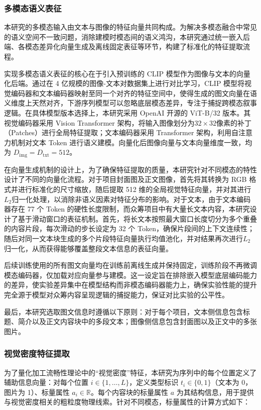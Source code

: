 \subsubsection{多模态语义表征}
本研究的多模态输入由文本与图像的特征向量共同构成。为解决多模态融合中常见的语义空间不一致问题，消除建模时模态间的语义鸿沟，本研究通过统一嵌入后端、各模态差异化向量生成及离线固定表征等环节，构建了标准化的特征提取流程。

实现多模态语义表征的核心在于引入预训练的 CLIP 模型作为图像与文本的向量化后端。通过在 4 亿规模的图像-文本对数据集上进行对比学习，CLIP 模型将视觉编码器和文本编码器映射至同一个对齐的特征空间中，使得生成的图文向量在语义维度上天然对齐，下游序列模型可以忽略底层模态差异，专注于捕捉跨模态叙事逻辑。在具体模型版本选择上，本研究采用 OpenAI 开源的 ViT-B/32 版本。其视觉编码器采用 Vision Transformer 架构，将输入图像划分为$ 32 \times 32 $像素的补丁（Patches）进行全局特征提取；文本编码器采用 Transformer 架构，利用自注意力机制对文本 Token 进行语义建模。向量化后图像向量与文本向量维度一致，均为 $ D_{\text{img}}=D_{\text{txt}}=512 $。

在向量生成机制的设计上，为了确保特征提取的质量，本研究针对不同模态的特性设计了不同的向量化流程。对于项目封面图及正文图像，首先将其转换为 RGB 格式并进行标准化的尺寸缩放，随后提取 512 维的全局视觉特征向量，并对其进行$ L_2 $归一化处理，以消除非语义因素对特征分布的影响。对于文本，由于文本编码器存在 77 个 Token 的硬性长度限制，而众筹项目中有大量长文本内容，本研究设计了基于滑动窗口的表征机制。首先，将长文本按照最大窗口长度切分为多个重叠的内容片段，每次滑动的步长设定为 32 个 Token，确保片段间的上下文连续性；随后对同一文本块生成的多个片段特征向量执行均值池化，并对结果再次进行$ L_2 $归一化，从而获得能够覆盖整段文本信息的表征向量。

后续训练使用的所有图文向量均在训练前离线生成并保持固定，训练阶段不再微调模态编码器，仅加载对应向量参与建模。这一设定旨在排除嵌入模型底层编码能力的差异，使实验差异集中在模型结构而非模态编码器能力上，确保实验性能的提升完全源于模型对众筹内容呈现逻辑的捕捉能力，保证对比实验的公平性。

最后，本研究选取图文信息时遵循以下原则：对于每个项目，文本侧信息包含标题、简介以及正文内容块中的多段文本；图像侧信息包含封面图以及正文中的多张图片。

\subsubsection{视觉密度特征提取}
为了量化加工流畅性理论中的“视觉密度”特征，本研究为序列中的每个位置定义了辅助信息向量：对每个位置 $ i\in\{1,\ldots,L\} $，定义类型标识 $ t_i\in\{0,1\} $（文本为 0，图片为 1）、标量属性 $ a_i\in\mathbb{R} $。每个内容块的标量属性 $ a $ 为其结构信息，用于提供与视觉密度相关的粗粒度物理线索。针对不同模态，标量属性的计算方式如下：

